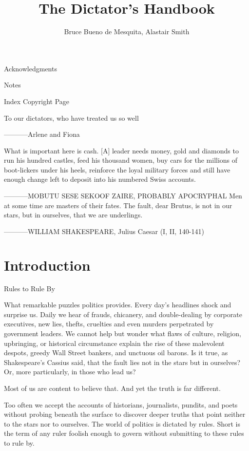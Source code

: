 \documentclass[10pt]{article}
\author{Bruce Bueno de Mesquita, Alastair Smith}
\title{The Dictator's Handbook}
\begin{document}
{\large Acknowledgments}

{\large Notes}

{\large Index Copyright Page}

{\large To our dictators, who have treated us so well }

{\large         -----------Arlene and Fiona}

{\large What is important here is cash. [A] leader needs money, gold and
diamonds to run his hundred castles, feed his thousand women, buy cars for the
millions of boot-lickers under his heels, reinforce the loyal military forces and
still have enough change left to deposit into his numbered Swiss accounts.}

{\large         -----------MOBUTU SESE SEKOOF ZAIRE, PROBABLY APOCRYPHAL}
{\large           }
{\large Men at some time are masters of their fates. The fault, dear Brutus, is
not in our stars, but in ourselves, that we are underlings.}

{\large         -----------WILLIAM SHAKESPEARE, Julius Caesar (I, II, 140-141)}
\pagebreak{}


\section{Introduction}

{\large Rules to Rule By}

{\large What remarkable puzzles politics provides. Every day's headlines shock
and surprise us. Daily we hear of frauds, chicanery, and double-dealing by
corporate executives, new lies, thefts, cruelties and even murders perpetrated by
government leaders. We cannot help but wonder what flaws of culture, religion,
upbringing, or historical circumstance explain the rise of these malevolent
despots, greedy Wall Street bankers, and unctuous oil barons. Is it true, as
Shakespeare's Cassius said, that the fault lies not in the stars but in
ourselves? Or, more particularly, in those who lead us?}

{\large Most of us are content to believe that. And yet the truth is far
different.}

{\large Too often we accept the accounts of historians, journalists, pundits,
and poets without probing beneath the surface to discover deeper truths that
point neither to the stars nor to ourselves. The world of politics is dictated by
rules. Short is the term of any ruler foolish enough to govern without submitting
to these rules to rule by.}
\end{document}
